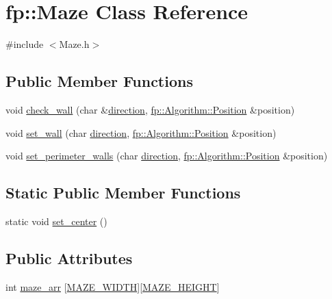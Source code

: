 \hypertarget{classfp_1_1_maze}{}\section{fp\+:\+:Maze Class Reference}
\label{classfp_1_1_maze}


{\ttfamily \#include $<$Maze.\+h$>$}

\subsection*{Public Member Functions}
\begin{DoxyCompactItemize}
\item 
void \hyperlink{classfp_1_1_maze_aba1478e35759947964959de45b6e5cb9}{check\+\_\+wall} (char \&\hyperlink{classfp_1_1_maze_a00c8f6ef7716d82c28e91b8cf29cbb68}{direction}, \hyperlink{structfp_1_1_algorithm_1_1_position}{fp\+::\+Algorithm\+::\+Position} \&position)
\item 
void \hyperlink{classfp_1_1_maze_a5f9ce00ecfc833c1a86a865bddaeb477}{set\+\_\+wall} (char \hyperlink{classfp_1_1_maze_a00c8f6ef7716d82c28e91b8cf29cbb68}{direction}, \hyperlink{structfp_1_1_algorithm_1_1_position}{fp\+::\+Algorithm\+::\+Position} \&position)
\item 
void \hyperlink{classfp_1_1_maze_aaed9b911fe0c4f3832c31fb2f409e756}{set\+\_\+perimeter\+\_\+walls} (char \hyperlink{classfp_1_1_maze_a00c8f6ef7716d82c28e91b8cf29cbb68}{direction}, \hyperlink{structfp_1_1_algorithm_1_1_position}{fp\+::\+Algorithm\+::\+Position} \&position)
\end{DoxyCompactItemize}
\subsection*{Static Public Member Functions}
\begin{DoxyCompactItemize}
\item 
static void \hyperlink{classfp_1_1_maze_af6396082d85af17f9dd383523e43e1a3}{set\+\_\+center} ()
\end{DoxyCompactItemize}
\subsection*{Public Attributes}
\begin{DoxyCompactItemize}
\item 
int \hyperlink{classfp_1_1_maze_a8610720d37ec84d7b2192b13334ea525}{maze\+\_\+arr} \mbox{[}\hyperlink{classfp_1_1_maze_ae976c87b67bf82c41ede75a19ac28c2c}{M\+A\+Z\+E\+\_\+\+W\+I\+D\+TH}\mbox{]}\mbox{[}\hyperlink{classfp_1_1_maze_a3cee2050b4d60bceacc9307e7016b931}{M\+A\+Z\+E\+\_\+\+H\+E\+I\+G\+HT}\mbox{]}
\end{DoxyCompactItemize}
